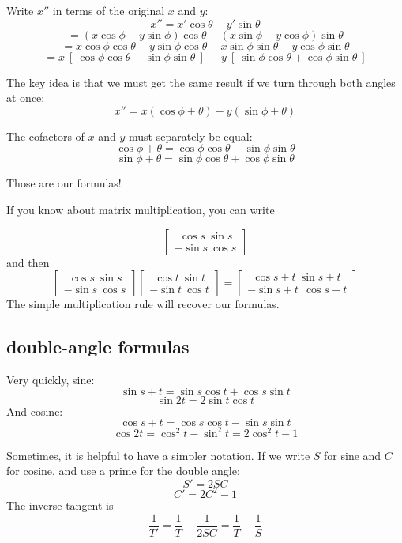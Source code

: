 \documentclass[11pt, oneside]{article}
\begin{document}
Write $x''$ in terms of the original $x$ and $y$:
\[ x'' = x' \cos \theta - y' \sin \theta \]
\[ = (x \cos \phi - y \sin \phi) \cos \theta - (x \sin \phi + y \cos \phi) \sin \theta \]
\[ = x \cos \phi \cos \theta - y \sin \phi \cos \theta - x \sin \phi \sin \theta - y \cos \phi \sin \theta \]
\[ = x \ [ \ \cos \phi \cos \theta - \sin \phi \sin \theta \ ] \ - y \ [ \ \sin \phi \cos \theta + \cos \phi \sin \theta \ ] \]

The key idea is that we must get the same result if we turn through both angles at once:
\[ x'' = x ( \cos \phi + \theta) - y (\sin \phi + \theta) \]

The cofactors of $x$ and $y$ must separately be equal:
\[ \cos \phi + \theta = \cos \phi \cos \theta - \sin \phi \sin \theta \]
\[ \sin \phi + \theta = \sin \phi \cos \theta + \cos \phi \sin \theta \]

Those are our formulas!

If you know about matrix multiplication, you can write 

\[ 
\begin{bmatrix}
\ \ \cos s \ \sin s \\
-\sin s \ \cos s 
\end{bmatrix}
\]
and then
\[
\begin{bmatrix}
\ \ \cos s \ \sin s \\
-\sin s \ \cos s 
\end{bmatrix}
\begin{bmatrix}
\ \ \cos t \ \sin t \\
-\sin t \ \cos t 
\end{bmatrix}
= \begin{bmatrix}
\ \ \cos s+t \  \sin s+t \\
- \sin s+t \ \ \cos s+t
\end{bmatrix}
\]
The simple multiplication rule will recover our formulas.

\subsection*{double-angle formulas}
Very quickly, sine:
\[ \sin s + t = \sin s \cos t + \cos s \sin t \]
\[ \sin 2t = 2 \sin t \cos t \]
And cosine:
\[ \cos s + t = \cos s \cos t - \sin s \sin t \]
\[ \cos 2t = \cos^2 t - \sin^2 t = 2 \cos^2 t - 1 \]

Sometimes, it is helpful to have a simpler notation.  If we write $S$ for sine and $C$ for cosine, and use a prime for the double angle:
\[ S' = 2SC \]
\[ C' = 2C^2 - 1 \]
The inverse tangent is
\[ \frac{1}{T'} = \frac{1}{T} - \frac{1}{2SC} = \frac{1}{T} - \frac{1}{S} \]
\end{document}
